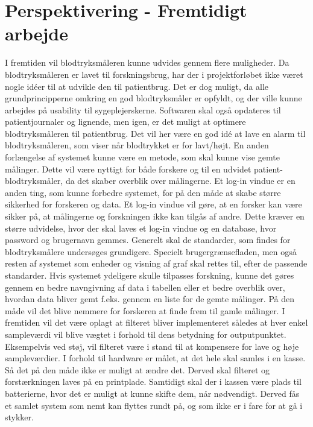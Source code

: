 \newpage
\section{Perspektivering - Fremtidigt arbejde}
I fremtiden vil blodtryksmåleren kunne udvides gennem flere muligheder. Da blodtryksmåleren er lavet til forskningsbrug, har der i projektforløbet ikke været nogle idéer til at udvikle den til patientbrug. Det er dog muligt, da alle grundprincipperne omkring en god blodtryksmåler er opfyldt, og der ville kunne arbejdes på usability til sygeplejerskerne. Softwaren skal også opdateres til patientjournaler og lignende, men igen, er det muligt at optimere blodtryksmåleren til patientbrug. Det vil her være en god idé at lave en alarm til blodtryksmåleren, som viser når blodtrykket er for lavt/højt. En anden forlængelse af systemet kunne være en metode, som skal kunne vise gemte målinger. Dette vil være nyttigt for både forskere og til en udvidet patient-blodtryksmåler, da det skaber overblik over målingerne. \newline 
Et log-in vindue er en anden ting, som kunne forbedre systemet, for på den måde at skabe større sikkerhed for forskeren og data. Et log-in vindue vil gøre, at en forsker kan være sikker på, at målingerne og forskningen ikke kan tilgås af andre. Dette kræver en større udvidelse, hvor der skal laves et log-in vindue og en database, hvor password og brugernavn gemmes. 
\newline
Generelt skal de standarder, som findes for blodtryksmålere undersøges grundigere. Specielt brugergrænsefladen, men også resten af systemet som enheder og visning af graf skal rettes til, efter de passende standarder.
\newline 
Hvis systemet ydeligere skulle tilpasses forskning, kunne det gøres gennem en bedre navngivning af data i tabellen eller et bedre overblik over, hvordan data bliver gemt f.eks. gennem en liste for de gemte målinger. På den måde vil det blive nemmere for forskeren at finde frem til gamle målinger.
I fremtiden vil det være oplagt at filteret bliver implementeret således at hver enkel sampleværdi vil blive vægtet i forhold til dens betydning for outputpunktet. Eksempelvis ved støj, vil filteret være i stand til at kompensere for lave og høje sampleværdier.
\newline 
I forhold til hardware er målet, at det hele skal samles i en kasse. Så det på den måde ikke er muligt at ændre det. Derved skal filteret og forstærkningen laves på en printplade. Samtidigt skal der i kassen være plads til batterierne, hvor det er muligt at kunne skifte dem, når nødvendigt. Derved fås et samlet system som nemt kan flyttes rundt på, og som ikke er i fare for at gå i stykker.